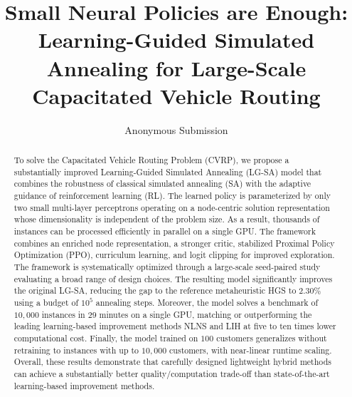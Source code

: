 \documentclass[letterpaper]{article} %
\title{
Small Neural Policies are Enough: \\
Learning-Guided Simulated Annealing for Large-Scale Capacitated Vehicle Routing
}
\author{
    Anonymous Submission
}
\begin{document}
\maketitle

\begin{abstract}


To solve the Capacitated Vehicle Routing Problem (CVRP), we propose a substantially improved Learning-Guided Simulated Annealing (LG-SA) model that combines the robustness of classical simulated annealing (SA) with the adaptive guidance of reinforcement learning (RL). The learned policy is parameterized by only two small multi-layer perceptrons operating on a node-centric solution representation whose dimensionality is independent of the problem size. As a result, thousands of instances can be processed efficiently in parallel on a single GPU. The framework combines an enriched node representation, a stronger critic, stabilized Proximal Policy Optimization (PPO), curriculum learning, and logit clipping for improved exploration. The framework is systematically optimized through a large-scale seed-paired study evaluating a broad range of design choices. The resulting model significantly improves the original LG-SA, reducing the gap to the reference metaheuristic HGS to $2.30\%$ using a budget of $10^5$ annealing steps. Moreover, the model solves a benchmark of $10{,}000$ instances in $29$ minutes on a single GPU, matching or outperforming the leading learning-based improvement methods NLNS and LIH at five to ten times lower computational cost. Finally, the model trained on $100$ customers generalizes without retraining to instances with up to $10{,}000$ customers, with near-linear runtime scaling. Overall, these results demonstrate that carefully designed lightweight hybrid methods can achieve a substantially better quality/computation trade-off than state-of-the-art learning-based improvement methods.


\end{abstract}
\end{document}
